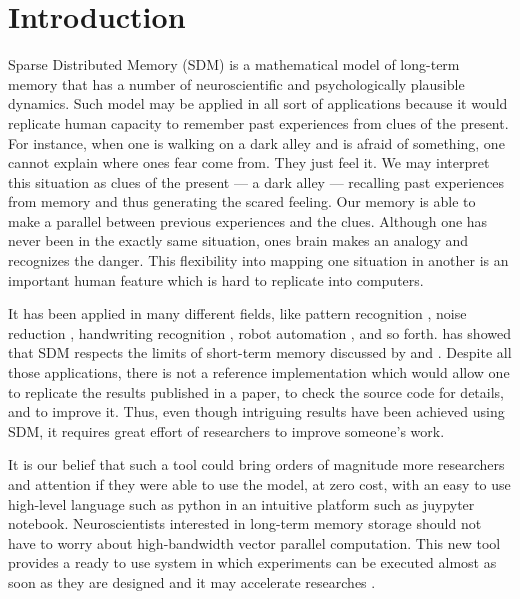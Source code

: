 
\chapter{Introduction}

Sparse Distributed Memory (SDM) \citep{Kanerva1988} is a mathematical model of long-term memory that has a number of neuroscientific and psychologically plausible dynamics. Such model may be applied in all sort of applications because it would replicate human capacity to remember past experiences from clues of the present. For instance, when one is walking on a dark alley and is afraid of something, one cannot explain where ones fear come from. They just feel it. We may interpret this situation as clues of the present --- a dark alley --- recalling past experiences from memory and thus generating the scared feeling. Our memory is able to make a parallel between previous experiences and the clues. Although one has never been in the exactly same situation, ones brain makes an analogy and recognizes the danger. This flexibility into mapping one situation in another is an important human feature which is hard to replicate into computers.

It has been applied in many different fields, like pattern recognition \citep{norman2003modeling, rao1995natural}, noise reduction \citep{Meng2009}, handwriting recognition \citep{fan1997genetic}, robot automation \citep{Rajesh1998, mendes2008robot}, and so forth. \cite{Linhares2011} has showed that SDM respects the limits of short-term memory discussed by \citet{Miller1995} and \citet{Cowan2011}. Despite all those applications, there is not a reference implementation which would allow one to replicate the results published in a paper, to check the source code for details, and to improve it. Thus, even though intriguing results have been achieved using SDM, it requires great effort of researchers to improve someone's work.

It is our belief that such a tool could bring orders of magnitude more researchers and attention if they were able to use the model, at zero cost, with an easy to use high-level language such as python in an intuitive platform such as juypyter notebook. Neuroscientists interested in long-term memory storage should not have to worry about high-bandwidth vector parallel computation.  This new tool provides a ready to use system in which experiments can be executed almost as soon as they are designed and it may accelerate researches \citep{shen2014interactive}.

